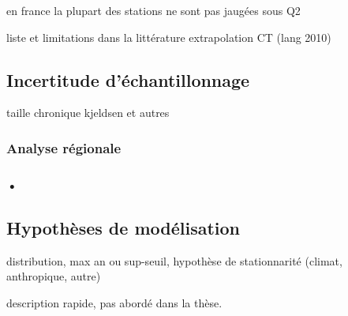 \documentclass[11pt]{article}
\begin{document}
	en france la plupart des stations ne sont pas jaugées sous Q2 
	
	liste et limitations dans la littérature
	extrapolation CT (lang 2010)
	
	\subsection{Incertitude d'échantillonnage}
	taille chronique kjeldsen et autres
		\subsubsection{Analyse régionale}	
		
		\subsubsection{•}
	
	\subsection{Hypothèses de modélisation}
	distribution, max an ou sup-seuil, hypothèse de stationnarité (climat, anthropique, autre)
	
	description rapide, pas abordé dans la thèse.
	
	

		

%
%
\end{document}
